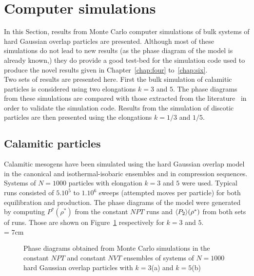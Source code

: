 

\section{Computer simulations}

In this Section, results from Monte Carlo computer simulations of bulk systems of hard Gaussian
overlap particles are presented. Although most of
these simulations do not lead to new results (as the phase diagram of the model is already
known,) they do provide a good test-bed for the simulation code used to produce the 
novel results given in Chapter~\ref{chap:four} to~\ref{chap:six}.\\
Two sets of results are presented here. First the bulk simulation of calamitic particles is
considered using two elongations $k=3$ and $5$. The phase diagrams from these simulations are
compared with those extracted from the literature~\cite{PadillaVelasco97,DeMiguelDelRio01}
in order to validate the simulation code. Results from the simulation of discotic particles are
then presented using the elongations $k=1/3$ and $1/5$.



\subsection{Calamitic particles}
\label{HGO_cal_res}
Calamitic mesogens have been simulated using the hard Gaussian overlap model in the canonical
and isothermal-isobaric ensembles and in compression sequences. 
Systems of $N=1000$ particles with elongation $k=3$ and $5$  were used. Typical runs consisted 
of $5.10^5$ to $1.10^6$ sweeps (\ie attempted moves per particle) for both equilibration and
production. The phase diagrams of the model were generated by computing $P^{*}(\rho^{*})$ 
from the constant $NPT$ runs and $\langle P_2 \rangle(\rho^{*})$ from both sets of runs. Those are shown on
Figure~\ref{fig:HGO_phaseDia_k3_5} respectively for $k=3$ and $5$.\\


\picW = 7cm
\begin{figure}
	\centering
	\caption{Phase diagrams obtained from Monte Carlo simulations in the constant $NPT$ and
	constant $NVT$ ensembles of systems of $N=1000$ hard Gaussian overlap particles with
	$k=3$(a) and $k=5$(b)}
	\label{fig:HGO_phaseDia_k3_5}
\end{figure}




